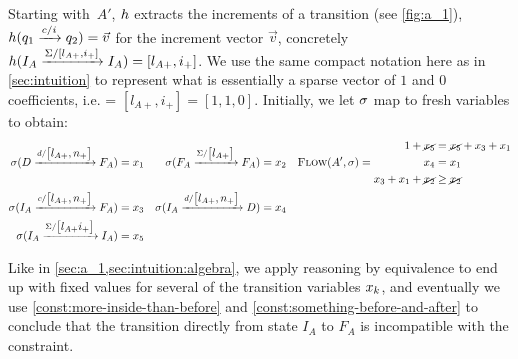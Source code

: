 Starting with~$A'$, $h$ extracts the increments of a transition (see
\cref{fig:a_1}), $h(q_1 \xrightarrow{c / i} q_2) = \Vec{v}$ for the increment
vector $\Vec{v}$, concretely $h(I_A \xrightarrow{\Sigma / \left[ l_{A+}, i_+
\right]} I_A) = \left[ l_{A+}, i_+ \right]$. We use the same compact notation
here as in \cref{sec:intuition} to represent what is essentially a sparse vector
of $1$ and $0$ coefficients, i.e. = $\left[ l_{A+}, i_+ \right] = \left[1, 1,
0\right]$. Initially, we let $\operatorname{\sigma}$ map to fresh variables to obtain:
\begin{equation}
    \begin{aligned}
      \operatorname{\sigma}(D \xrightarrow{d/\begin{bmatrix}l_{A+}, n_+\end{bmatrix}} F_A) & = x_1    & 
                \operatorname{\sigma}(F_A \xrightarrow{\Sigma/\begin{bmatrix} l_{A+} \end{bmatrix}} F_A ) & = x_2 &       \textsc{Flow}(A', \operatorname{\sigma}) & = \begin{aligned}
                    1 + \cancel{x_5} &= \cancel{x_5} + x_3 + x_1\\
                    x_4 &= x_1 \\
                    x_3 + x_1 + \cancel{x_2} &\geq \cancel{x_2}  \\
                  \end{aligned} \\
      \operatorname{\sigma}(I_A \xrightarrow{c/\begin{bmatrix}l_{A+}, n_+\end{bmatrix}} F_A ) & =  x_3 & 
                \operatorname{\sigma}(I_A \xrightarrow{d/\begin{bmatrix}l_{A+}, n_+\end{bmatrix}} D) & = x_4 &\\
      \operatorname{\sigma}(I_A \xrightarrow{\Sigma/\begin{bmatrix} l_{A+} i_+\end{bmatrix}} I_A) & = x_5 & 
    \end{aligned}
\end{equation}\label{eq:single-filter}

Like in \cref{sec:a_1,sec:intuition:algebra}, we apply reasoning by equivalence
  to end up with fixed values for several of the transition variables
  $x_k$, and eventually we use \cref{const:more-inside-than-before}
  and \cref{const:something-before-and-after} to conclude that the transition
  directly from state $I_{A}$ to $F_{A}$ is incompatible with the constraint.

